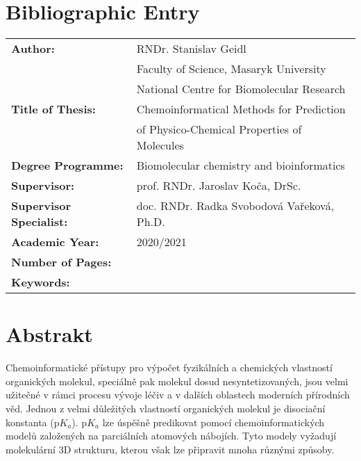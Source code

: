 \documentclass[11pt,b5paper,oneside,final]{book}
\begin{document}
\vfill
\section*{Bibliographic Entry}
\def\arraystretch{1.5}
\begin{tabular}{ ll } 
  \textbf{Author:}                & RNDr. Stanislav Geidl \\
                                  & Faculty of Science, Masaryk University \\
                                  & National Centre for Biomolecular Research \\
  \textbf{Title of Thesis:}       & Chemoinformatical Methods for Prediction \\
                                  & of Physico-Chemical Properties of Molecules \\ 
  \textbf{Degree Programme:}      & Biomolecular chemistry and bioinformatics \\
  \textbf{Supervisor:}            & prof. RNDr. Jaroslav Koča, DrSc. \\
  \textbf{Supervisor Specialist:} & doc. RNDr. Radka Svobodová Vařeková, Ph.D. \\
  \textbf{Academic Year:}         & 2020/2021 \\
  \textbf{Number of Pages:}       & \\
  \textbf{Keywords:}              &  \\
\end{tabular}
\clearpage

\pagestyle{plain}

\section*{Abstrakt}
Chemoinformatické přístupy pro výpočet fyzikálních a chemických vlastností
organických molekul, speciálně pak molekul dosud nesyntetizovaných, jsou velmi
užitečné v rámci procesu vývoje léčiv a v dalších oblastech moderních přírodních
věd. Jednou z velmi důležitých vlastností organických molekul je disociační
konstanta (p$K_a$). p$K_a$ lze úspěšně predikovat pomocí chemoinformatických
modelů založených na parciálních atomových nábojích. Tyto modely vyžadují
molekulární 3D strukturu, kterou však lze připravit mnoha různými způsoby.
\end{document}
